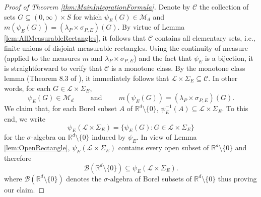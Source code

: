 \documentclass[11pt]{article}
\theoremstyle{remark}
\begin{document}

\begin{proof}[Proof of Theorem \ref{thm:MainIntegrationFormula}]
Denote by $\mathcal{C}$ the collection of sets $G\subseteq (0,\infty)\times S$ for which $\psi_E(G)\in \mathcal{M}_d$ and $m(\psi_E(G))=(\lambda_P\times\sigma_{P,E})(G).$ By virtue of Lemma \ref{lem:AllMeasurableRectangles}, it follows that $\mathcal{C}$ contains all elementary sets, i.e., finite unions of disjoint measurable rectangles. Using the continuity of measure (applied to the measures $m$ and $\lambda_P\times\sigma_{P,E}$) and the fact that $\psi_E$ is a bijection, it is straightforward to verify that $\mathcal{C}$ is a monotone class. By the monotone class lemma (Theorem 8.3 of \cite{Rudin1987}), it immediately follows that $\mathcal{L}\times\Sigma_E\subseteq\mathcal{C}$. In other words, for each $G\in\mathcal{L}\times\Sigma_E$,
\begin{equation}\label{eq:Good1}
\psi_E(G)\in\mathcal{M}_d\hspace{1cm}\mbox{and}\hspace{1cm}m(\psi_E(G))=(\lambda_P\times\sigma_{P,E})(G).
\end{equation}
We claim that, for each Borel subset $A$ of $\mathbb{R}^d\setminus\{0\}$, $\psi_E^{-1}(A)\subseteq \mathcal{L}\times\Sigma_E$. To this end, we write
\begin{equation*}
\psi_E(\mathcal{L}\times\Sigma_E)=\{\psi_E(G):G\in\mathcal{L}\times\Sigma_E\}
\end{equation*}
for the $\sigma$-algebra on $\mathbb{R}^d\setminus\{0\}$ induced by $\psi_E$. In view of Lemma \ref{lem:OpenRectangle}, $\psi_E(\mathcal{L}\times\Sigma_E)$ contains every open subset of $\mathbb{R}^d\setminus\{0\}$ and therefore
\begin{equation*}
\mathcal{B}(\mathbb{R}^d\setminus\{0\})\subseteq\psi_E(\mathcal{L}\times\Sigma_E).
\end{equation*}
where $\mathcal{B}(\mathbb{R}^d\setminus\{0\})$ denotes the $\sigma$-algebra of Borel subsets of $\mathbb{R}^d\setminus\{0\}$ thus proving our claim. 


\end{proof}
\end{document}
